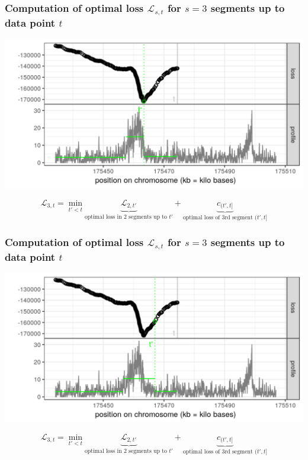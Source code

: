 \begin{frame}
\frametitle{Computation of optimal loss $\mathcal L_{s, t}$
 for $s=3$ segments up to data point $t$}
  \includegraphics[width=\textwidth]{figure-dp-third-3.png}

$$
\mathcal L_{3, t} =
\min_{
  t' < t
}
\underbrace{
  \mathcal L_{2, t'}
}_{
  \text{optimal loss in 2 segments up to $t'$}
}
+
\underbrace{
  c_{(t', t]}
}_{
  \text{optimal loss of 3rd segment $(t', t]$}
}
$$

\end{frame}
 
\begin{frame}
\frametitle{Computation of optimal loss $\mathcal L_{s, t}$
 for $s=3$ segments up to data point $t$}
  \includegraphics[width=\textwidth]{figure-dp-third-4.png}

$$
\mathcal L_{3, t} =
\min_{
  t' < t
}
\underbrace{
  \mathcal L_{2, t'}
}_{
  \text{optimal loss in 2 segments up to $t'$}
}
+
\underbrace{
  c_{(t', t]}
}_{
  \text{optimal loss of 3rd segment $(t', t]$}
}
$$

\end{frame}
